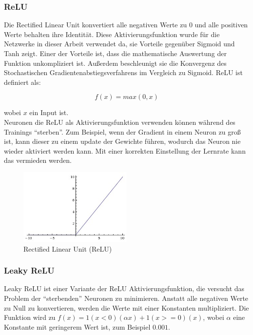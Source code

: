 \subsubsection{ReLU}
Die Rectified Linear Unit konvertiert alle negativen Werte zu 0 und alle positiven Werte behalten ihre Identität. Diese Aktivierungsfunktion
wurde für die Netzwerke in dieser Arbeit verwendet da, sie Vorteile gegenüber Sigmoid und Tanh zeigt. Einer der Vorteile ist, dass die mathematische
Auswertung der Funktion unkompliziert ist. Außerdem beschleunigt sie die Konvergenz des Stochastischen Gradientenabstiegsverfahrens im Vergleich zu Sigmoid.
ReLU ist definiert als:

\begin{equation}
  f(x) = max(0, x)
\end{equation}

wobei $x$ ein Input ist.
\\
Neuronen die ReLU als Aktivierungsfunktion verwenden können während des Trainings ``sterben''. Zum Beispiel, wenn der Gradient in einem Neuron
zu groß ist, kann dieser zu einem update der Gewichte führen, wodurch das Neuron nie wieder aktiviert werden kann. Mit einer korrekten Einstellung der
Lernrate kann das vermieden werden. \cite{cs231-neural-networks}

\begin{figure}[H]
  \centering
  \includegraphics[width=0.5\textwidth]{resources/nn/relu.jpeg}
  \caption{
    Rectified Linear Unit (ReLU) 
    \cite{neuron-model}
  }
  \label{image:relu}
\end{figure}

\subsubsection{Leaky ReLU}
Leaky ReLU ist einer Variante der ReLU Aktivierungsfunktion, die versucht das Problem der ``sterbenden'' Neuronen zu minimieren. Anstatt alle negativen Werte
zu Null zu konvertieren, werden die Werte mit einer Konstanten multipliziert. Die Funktion wird zu $ f(x) = 1(x < 0)(\alpha x) + 1(x >= 0)(x)$,
wobei $ \alpha $ eine Konstante mit geringerem Wert ist, zum Beispiel $ 0.001 $.

